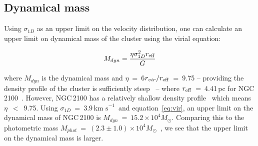 \documentclass[useAMS,usenatbib]{mn2e}
\def\kms{$\mbox{km s}^{-1}$}
\begin{document}




\subsection{Dynamical mass} %
\label{sub:dynamical_mass}


Using $\sigma_{1D}$ as an upper limit on the velocity distribution, one can calculate an upper limit on dynamical mass of the cluster using the virial equation:

\begin{equation}
  M_{dyn} = \frac{\eta\sigma_{1D}^{2}r_{\rm eff}}{G}
  \label{eq:vir}
\end{equation}

\noindent where $M_{dyn}$ is the dynamical mass and $\eta$~=~6$r_{vir}/r_{\rm eff}$~=~9.75 -- providing the density profile of the cluster is sufficiently steep~\citep{2010ARA&A..48..431P} --
where $r_{\rm eff}$~=~4.41\,pc for NGC\,2100~\citep{2005ApJS..161..304M}.
However, NGC\,2100 has a relatively shallow density profile~\citep[$\gamma$~=~$2.44\pm0.14$;][]{2003MNRAS.338...85M}
which means $\eta$~$<$~9.75.
Using $\sigma_{1D}$~=~$3.9$\,\kms~and equation~\ref{eq:vir}, an upper limit on the dynamical mass of NGC\,2100 is $M_{dyn}$~=~$15.2\times 10^{4}M_{\odot}$.
Comparing this to the photometric mass $M_{phot}$~=~$(2.3\pm1.0)\times 10^{4}M_{\odot}$~\citep{2005ApJS..161..304M},
we see that the upper limit on the dynamical mass is larger.
\end{document}
